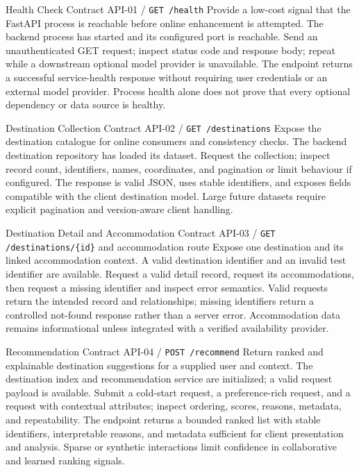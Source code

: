 \EvidenceSheet
{Health Check Contract}
{API-01 / \texttt{GET /health}}
{Provide a low-cost signal that the FastAPI process is reachable before online enhancement is attempted.}
{The backend process has started and its configured port is reachable.}
{Send an unauthenticated GET request; inspect status code and response body; repeat while a downstream optional model provider is unavailable.}
{The endpoint returns a successful service-health response without requiring user credentials or an external model provider.}
{Process health alone does not prove that every optional dependency or data source is healthy.}

\EvidenceSheet
{Destination Collection Contract}
{API-02 / \texttt{GET /destinations}}
{Expose the destination catalogue for online consumers and consistency checks.}
{The backend destination repository has loaded its dataset.}
{Request the collection; inspect record count, identifiers, names, coordinates, and pagination or limit behaviour if configured.}
{The response is valid JSON, uses stable identifiers, and exposes fields compatible with the client destination model.}
{Large future datasets require explicit pagination and version-aware client handling.}

\EvidenceSheet
{Destination Detail and Accommodation Contract}
{API-03 / \texttt{GET /destinations/\{id\}} and accommodation route}
{Expose one destination and its linked accommodation context.}
{A valid destination identifier and an invalid test identifier are available.}
{Request a valid detail record, request its accommodations, then request a missing identifier and inspect error semantics.}
{Valid requests return the intended record and relationships; missing identifiers return a controlled not-found response rather than a server error.}
{Accommodation data remains informational unless integrated with a verified availability provider.}

\EvidenceSheet
{Recommendation Contract}
{API-04 / \texttt{POST /recommend}}
{Return ranked and explainable destination suggestions for a supplied user and context.}
{The destination index and recommendation service are initialized; a valid request payload is available.}
{Submit a cold-start request, a preference-rich request, and a request with contextual attributes; inspect ordering, scores, reasons, metadata, and repeatability.}
{The endpoint returns a bounded ranked list with stable identifiers, interpretable reasons, and metadata sufficient for client presentation and analysis.}
{Sparse or synthetic interactions limit confidence in collaborative and learned ranking signals.}

